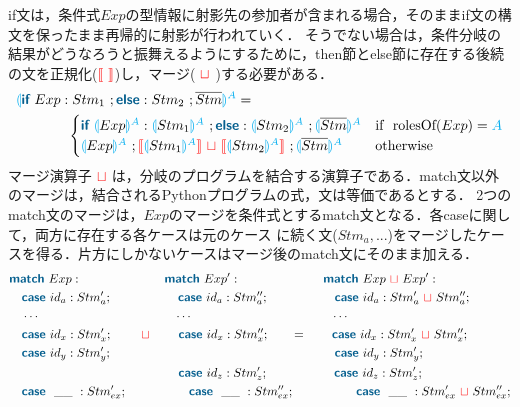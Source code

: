 \documentclass{thesis}
\newcommand{\projection}[2]{{\color{cyan}\llparenthesis}#1{\color{cyan}\rrparenthesis^#2}}
\newcommand{\mblue}[1]{\textbf{\textsf{\color{MidnightBlue}#1}}}
\newcommand{\cyan}[1]{\color{cyan}#1}
\newcommand{\nl}[1]{{\color{red}{\llbracket}}#1{\color{red}{\rrbracket}}} %
\newcommand{\mg}{~{\color{red}{\sqcup}}~} %
\begin{document}
if文は，条件式$Exp$の型情報に射影先の参加者が含まれる場合，そのままif文の構文を保ったまま再帰的に射影が行われていく．
そうでない場合は，条件分岐の結果がどうなろうと振舞えるようにするために，then節とelse節に存在する後続の文を正規化(${\color{red}{\llbracket}}~{\color{red}{\rrbracket}}$)し，マージ($~{\color{red}{\sqcup}}~$)する必要がある．
\begin{alignat*}{2} 
  &\projection{\mblue{if}~Exp:Stm_1~;\mblue{else}:Stm_2 ~;\overline{Stm}}{A}=\\
  &
  ~~~~~~~~~~~\begin{cases}
    \mblue{if}~\projection{Exp}{A} : \projection{Stm_1}{A} ~; \mblue{else}:\projection{Stm_2}{A} ~;\projection{\overline{Stm}}{A} & \text{if}~~ \text{rolesOf}(Exp) = \cyan{A}\\
    \projection{Exp}{A} ~; \nl{\projection{Stm_1}{A}} \mg \nl{\projection{Stm_2}{A}} ~;\projection{\overline{Stm}}{A} & \text{otherwise}
  \end{cases}\\
\end{alignat*}
マージ演算子$\mg$は，分岐のプログラムを結合する演算子である．\textsf{match}文以外のマージは，結合されるPythonプログラムの式，文は等価であるとする．
2つのmatch文のマージは，$Exp$のマージを条件式とするmatch文となる．各caseに関して，両方に存在する各ケースは元のケース
に続く文($Stm_a,...$)をマージしたケースを得る．片方にしかないケースはマージ後のmatch文にそのまま加える．
\begin{alignat*}{2} 
  & \mblue{match}~Exp: ~~~~~~~~~~~~~~~~~~~~\mblue{match}~Exp': ~~~~~~~~~~~~~~~~~~~~\mblue{match}~Exp \mg Exp':\\
  & ~~~\mblue{case}~id_a : Stm'_a; ~~~~~~~~~~~~~~~~\mblue{case}~id_a : Stm''_a; ~~~~~~~~~~~~~~~~\mblue{case}~id_a : Stm'_a \mg Stm''_a;\\
  & ~~~\cdots ~~~~~~~~~~~~~~~~~~~~~~~~~~~~~~~~~\cdots ~~~~~~~~~~~~~~~~~~~~~~~~~~~~~~~~~~\cdots\\
  & ~~~\mblue{case}~id_x : Stm'_x; ~~~~~~\mg~~~~~~\mblue{case}~id_x : Stm''_x; ~~~~~~=~~~~~~\mblue{case}~id_x : Stm'_x \mg Stm''_x;\\
  & ~~~\mblue{case}~id_y : Stm'_y; ~~~~~~~~~~~~~~~~~~~~~~~~~~~~~~~~~~~~~~~~~~~~~~~~~~~~~~\mblue{case}~id_y : Stm'_y; \\
  & ~~~~~~~~~~~~~~~~~~~~~~~~~~~~~~~~~~~~~~~~~\mblue{case}~id_z : Stm'_z;~~~~~~~~~~~~~~~~\mblue{case}~id_z : Stm'_z;\\
  & ~~~\mblue{case}~~\_\_ ~: Stm'_{ex}; ~~~~~~~~~~~~~~~\mblue{case}~~\_\_ ~: Stm''_{ex}; ~~~~~~~~~~~~~~~\mblue{case}~~\_\_ ~:Stm'_{ex} \mg Stm''_{ex};\\
\end{alignat*}
\end{document}
